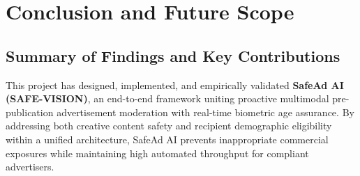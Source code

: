 \documentclass[12pt,a4paper]{report}
\begin{document}

\chapter{Conclusion and Future Scope}

\section{Summary of Findings and Key Contributions}

This project has designed, implemented, and empirically validated \textbf{SafeAd AI (SAFE-VISION)}, an end-to-end framework uniting proactive multimodal pre-publication advertisement moderation with real-time biometric age assurance. By addressing both creative content safety and recipient demographic eligibility within a unified architecture, SafeAd AI prevents inappropriate commercial exposures while maintaining high automated throughput for compliant advertisers.
\end{document}
